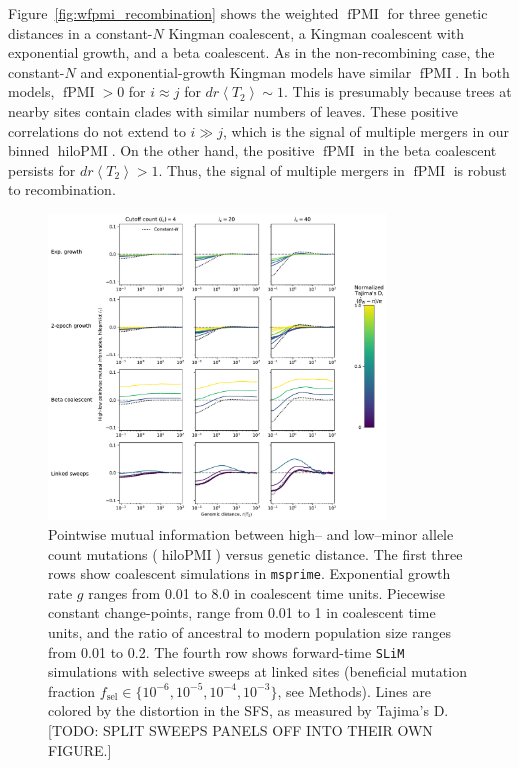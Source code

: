 \documentclass[11pt, letterpaper]{article}   	%
\newcommand{\Fig}[1]{Figure~\ref{#1}}
\newcommand{\E}[1]{\left< #1 \right>}
\DeclareMathOperator{\fpmi}{fPMI}
\DeclareMathOperator{\hilopmi}{hiloPMI}
\begin{document}
\Fig{fig:wfpmi_recombination} shows the weighted $\fpmi$ for three genetic distances in a constant-$N$ Kingman coalescent, a Kingman coalescent with exponential growth, and a beta coalescent.
As in the non-recombining case, the constant-$N$ and exponential-growth Kingman models have similar $\fpmi$.
In both models, $\fpmi > 0$ for $i\approx j$ for $d r \E{T_2} \sim 1$.
This is presumably because trees at nearby sites contain clades with similar numbers of leaves.
These positive correlations do not extend to $i \gg j$, which is the signal of multiple mergers in our binned $\hilopmi$.
On the other hand, the positive $\fpmi$ in the beta coalescent persists for $d r \E{T_2} > 1$.
Thus, the signal of multiple mergers in $\fpmi$ is robust to recombination.

\begin{figure}
\centering
\includegraphics[width=0.8\textwidth]{figures/figure5.pdf}
\caption{Pointwise mutual information between high-- and low--minor allele count mutations ($\hilopmi$) versus genetic distance. The first three rows show coalescent simulations in \texttt{msprime}. Exponential growth rate $g$ ranges from 0.01 to 8.0 in coalescent time units. Piecewise constant change-points, range from 0.01 to 1 in coalescent time units, and the ratio of ancestral to modern population size ranges from 0.01 to 0.2. The fourth row shows forward-time \texttt{SLiM} simulations with selective sweeps at linked sites (beneficial mutation fraction $f_{\text{sel}} \in \{10^{-6}, 10^{-5}, 10^{-4}, 10^{-3}\}$, see Methods). Lines are colored by the distortion in the SFS, as measured by Tajima's D. [TODO: SPLIT SWEEPS PANELS OFF INTO THEIR OWN FIGURE.]\label{fig:hilo_vs_d}}
\end{figure}
\end{document}
